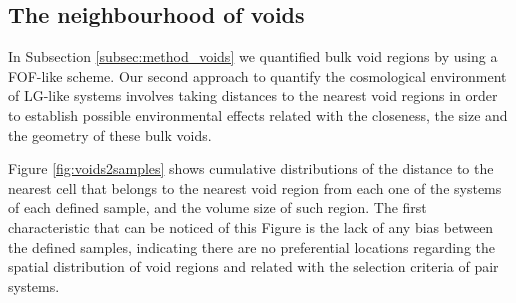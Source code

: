 \documentclass[a4,useAMS,usenatbib,usegraphicx]{latex/mn2e}
\begin{document}
\subsection{The neighbourhood of voids}
\label{subsec:neighbourhood_voids}



In Subsection \ref{subsec:method_voids} we quantified bulk void regions 
by using a FOF-like scheme. Our second approach to quantify the 
cosmological environment of LG-like systems involves taking distances to 
the nearest void regions in order to establish possible environmental 
effects related with the closeness, the size and the geometry of these 
bulk voids.



Figure \ref{fig:voids2samples} shows cumulative distributions of the 
distance to the nearest cell that belongs to the nearest void region from
each one of the systems of each defined sample, and the volume size of such 
region. The first characteristic that can be noticed of this Figure is the 
lack of any bias between the defined samples, indicating there are no 
preferential locations regarding the spatial distribution of void regions 
and related with the selection criteria of pair systems. 
\end{document}
